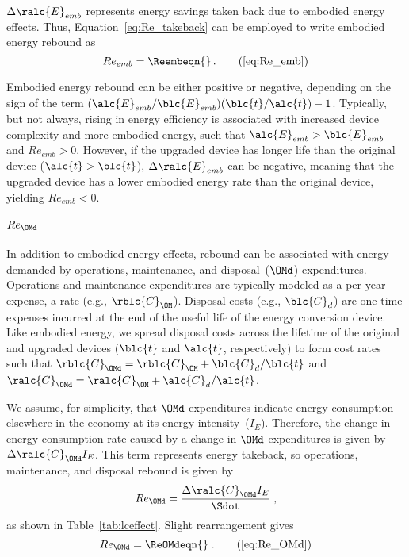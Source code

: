 $\Delta \ralc{E}_{emb}$ represents energy savings taken back due to embodied energy effects.
Thus, Equation~\ref{eq:Re_takeback} can be employed to write embodied energy rebound as
%
\begin{equation} 
  Re_{emb} = \Reembeqn{} \, . \tag{\ref{eq:Re_emb}}
\end{equation}

Embodied energy rebound can be either positive or negative, depending on 
the sign of the term
$(\alc{E}_{emb}/\blc{E}_{emb})(\blc{t}/\alc{t}) - 1$.
Typically, but not always,
rising in energy efficiency is associated with increased device complexity
and more embodied energy,
such that $\alc{E}_{emb} > \blc{E}_{emb}$ and $Re_{emb} > 0$.
However, if the upgraded device has longer life than the original device
($\alc{t} > \blc{t}$),
$\Delta \ralc{E}_{emb}$ can be negative,
meaning that the upgraded device has a lower embodied energy rate than the original device,
yielding $Re_{emb} < 0$.


\paragraph{$Re_{\OMd}$} 
\label{sec:Re_OMd}

In addition to embodied energy effects, 
rebound can be associated with energy demanded by operations, maintenance, and disposal~($\OMd$) expenditures.
Operations and maintenance expenditures are typically modeled as a per-year expense, a rate (e.g., $\rblc{C}_{\OM}$).
Disposal costs (e.g., $\blc{C}_d$) are one-time expenses incurred at the end of the useful life of the energy conversion device.
Like embodied energy, we spread disposal costs across the lifetime 
of the original and upgraded devices ($\blc{t}$ and $\alc{t}$, respectively)
to form cost rates such that $\rblc{C}_{\OMd} = \rblc{C}_{\OM} + \blc{C}_d/\blc{t}$
and
$\ralc{C}_{\OMd} = \ralc{C}_{\OM} + \alc{C}_d/\alc{t}$.

We assume, for simplicity, that $\OMd$ expenditures indicate energy consumption
elsewhere in the economy at its energy intensity~($I_E$).
Therefore, the change in energy consumption rate caused by a change in $\OMd$ expenditures
is given by $\Delta \ralc{C}_{\OMd} I_E$.
This term represents energy takeback, so operations, maintenance, and disposal rebound is given by
%
\begin{equation} \label{eq:Re_OMd_def}
  Re_{\OMd} = \frac{\Delta \ralc{C}_{\OMd} I_E}{\Sdot} \; ,
\end{equation}
%
as shown in Table~\ref{tab:lceffect}.
Slight rearrangement gives
%
\begin{equation}
  Re_{\OMd} = \ReOMdeqn{} \; . \tag{\ref{eq:Re_OMd}}
\end{equation}

